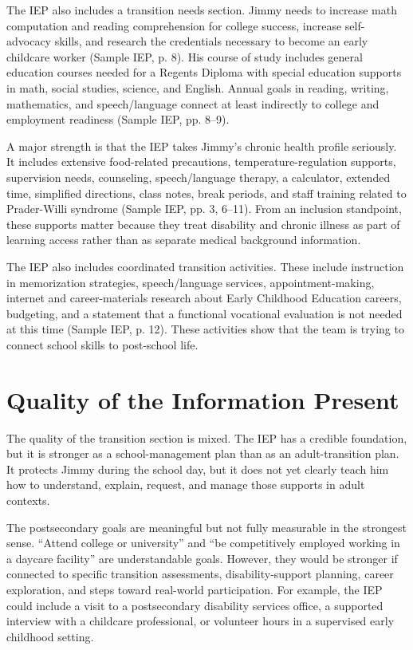 \documentclass[11pt]{article}
\begin{document}
The IEP also includes a transition needs section. Jimmy needs to increase math computation and reading comprehension for college success, increase self-advocacy skills, and research the credentials necessary to become an early childcare worker (Sample IEP, p. 8). His course of study includes general education courses needed for a Regents Diploma with special education supports in math, social studies, science, and English. Annual goals in reading, writing, mathematics, and speech/language connect at least indirectly to college and employment readiness (Sample IEP, pp. 8--9).

A major strength is that the IEP takes Jimmy's chronic health profile seriously. It includes extensive food-related precautions, temperature-regulation supports, supervision needs, counseling, speech/language therapy, a calculator, extended time, simplified directions, class notes, break periods, and staff training related to Prader-Willi syndrome (Sample IEP, pp. 3, 6--11). From an inclusion standpoint, these supports matter because they treat disability and chronic illness as part of learning access rather than as separate medical background information.

The IEP also includes coordinated transition activities. These include instruction in memorization strategies, speech/language services, appointment-making, internet and career-materials research about Early Childhood Education careers, budgeting, and a statement that a functional vocational evaluation is not needed at this time (Sample IEP, p. 12). These activities show that the team is trying to connect school skills to post-school life.

\section{Quality of the Information Present}

The quality of the transition section is mixed. The IEP has a credible foundation, but it is stronger as a school-management plan than as an adult-transition plan. It protects Jimmy during the school day, but it does not yet clearly teach him how to understand, explain, request, and manage those supports in adult contexts.

The postsecondary goals are meaningful but not fully measurable in the strongest sense. ``Attend college or university'' and ``be competitively employed working in a daycare facility'' are understandable goals. However, they would be stronger if connected to specific transition assessments, disability-support planning, career exploration, and steps toward real-world participation. For example, the IEP could include a visit to a postsecondary disability services office, a supported interview with a childcare professional, or volunteer hours in a supervised early childhood setting.
\end{document}
